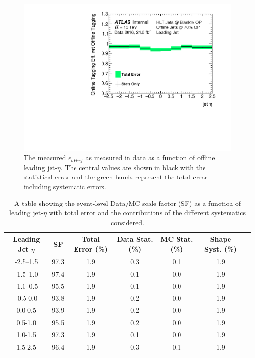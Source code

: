 \begin{figure}[!ht]
  \begin{center}
    \includegraphics[width=0.8\linewidth, angle=0]{figs/Trigger/btrigger_old/fullSyst_EventEfficiency_leadingJetEta.pdf}
  \end{center}
  \caption{
    The measured $\epsilon_{bPerf}$ as measured in data as a function of offline leading jet-$\eta$.
    The central values are shown in black with the statistical error and the green bands represent the total error including systematic errors.
  }
  \label{fig:bTrig_eventSys}
\end{figure}

\begin{table}[!ht]
\begin{tabular}{|c||c|c||c|c|c||c|}
Leading Jet $\eta$ & SF & Total Error (\%) & Data Stat. (\%) & MC Stat. (\%) & Shape Syst. (\%)\\
\hline
-2.5--1.5 & 97.3 & 1.9 & 0.3 & 0.1 & 1.9 \\
-1.5--1.0 & 97.4 & 1.9 & 0.1 & 0.0 & 1.9 \\
-1.0--0.5 & 95.5 & 1.9 & 0.1 & 0.0 & 1.9 \\
-0.5-0.0 & 93.8 & 1.9 & 0.2  & 0.0 & 1.9 \\
0.0-0.5 & 93.9 & 1.9 & 0.2   & 0.0 & 1.9 \\
0.5-1.0 & 95.5 & 1.9 & 0.2   & 0.0 & 1.9 \\
1.0-1.5 & 97.3 & 1.9 & 0.1   & 0.0 & 1.9 \\
1.5-2.5 & 96.4 & 1.9 & 0.3   & 0.1 & 1.9 \\
\end{tabular}
\caption{A table showing the event-level Data/MC scale factor (SF) as a function of leading jet-$\eta$ with total error and the contributions of the different systematics considered.}
\label{tab:bTrig_eventEff}
\end{table}

